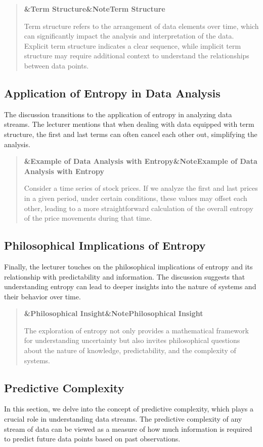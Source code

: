 \documentclass[a4paper]{article}
\newcommand{\boxheading}[1]{%
  \par\smallskip
  \noindent\textbf{\ifx&#1&Note\else#1\fi}\par
  \smallskip
}
\newenvironment{defbox}[1][]{%
  \begin{quote}\color{green!40!black}\boxheading{#1}\normalcolor
}{\end{quote}}
\newenvironment{exbox}[1][]{%
  \begin{quote}\color{brown!70!black}\boxheading{#1}\normalcolor
}{\end{quote}}
\newenvironment{rembox}[1][]{%
  \begin{quote}\color{black!70}\boxheading{#1}\normalcolor
}{\end{quote}}
\begin{document}
\begin{defbox}[Term Structure]
Term structure refers to the arrangement of data elements over time, which can significantly impact the analysis and interpretation of the data. Explicit term structure indicates a clear sequence, while implicit term structure may require additional context to understand the relationships between data points.
\end{defbox}

\subsection{Application of Entropy in Data Analysis}
The discussion transitions to the application of entropy in analyzing data streams. The lecturer mentions that when dealing with data equipped with term structure, the first and last terms can often cancel each other out, simplifying the analysis.

\begin{exbox}[Example of Data Analysis with Entropy]
Consider a time series of stock prices. If we analyze the first and last prices in a given period, under certain conditions, these values may offset each other, leading to a more straightforward calculation of the overall entropy of the price movements during that time.
\end{exbox}

\subsection{Philosophical Implications of Entropy}
Finally, the lecturer touches on the philosophical implications of entropy and its relationship with predictability and information. The discussion suggests that understanding entropy can lead to deeper insights into the nature of systems and their behavior over time.

\begin{rembox}[Philosophical Insight]
The exploration of entropy not only provides a mathematical framework for understanding uncertainty but also invites philosophical questions about the nature of knowledge, predictability, and the complexity of systems.
\end{rembox}

\subsection{Predictive Complexity}
In this section, we delve into the concept of predictive complexity, which plays a crucial role in understanding data streams. The predictive complexity of any stream of data can be viewed as a measure of how much information is required to predict future data points based on past observations.
\end{document}
